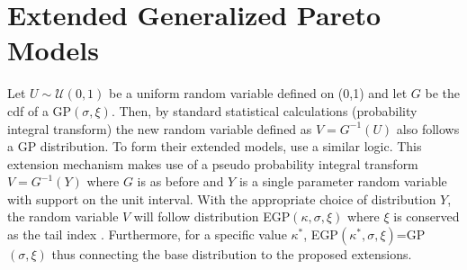 \documentclass[12pt]{article}
\theoremstyle{definition}
\theoremstyle{definition}
\begin{document}
\section{Extended Generalized Pareto Models}
Let $U\sim \mathcal{U}(0,1)$ be a uniform random variable defined on (0,1) and let $G$ be the cdf of a GP$(\sigma,\xi)$. Then, by standard statistical calculations (probability integral transform) the new random variable defined as $V=G^{-1}(U)$ also follows a GP distribution. To form their extended models, \cite{papatawn} use a similar logic. This extension mechanism makes use of a pseudo probability integral transform $V=G^{-1}(Y)$ where $G$ is as before and $Y$ is a single parameter random variable with support on the unit interval. With the appropriate choice of distribution $Y$, the random variable $V$ will follow distribution EGP$(\kappa, \sigma,\xi)$ where $\xi$ is conserved as the tail index \cite{papatawn}. Furthermore, for a specific value $\kappa^*$, EGP$(\kappa^*, \sigma,\xi)$=GP$(\sigma,\xi)$ thus connecting the base distribution to the proposed extensions. 
\end{document}
